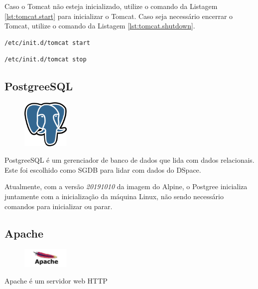 Caso o Tomcat não esteja inicializado, utilize o comando da Listagem \ref{lst:tomcat.start} para inicializar o Tomcat. Caso seja necessário encerrar o Tomcat, utilize o comando da Listagem \ref{lst:tomcat.shutdown}.

\begin{lstlisting}[language=bash, label=lst:tomcat.start, caption=Inicializando Tomcat.]
    /etc/init.d/tomcat start
\end{lstlisting}

\begin{lstlisting}[language=bash, label=lst:tomcat.shutdown, caption=Encerrando Tomcat.]
    /etc/init.d/tomcat stop
\end{lstlisting}

\subsection{PostgreeSQL}\label{postgree}
\begin{figure} %
    \centering
    \includegraphics[width=0.2\textwidth]{../images/postgree.png}
\end{figure}
PostgreeSQL é um gerenciador de banco de dados que lida com dados relacionais. Este foi escolhido como SGDB para lidar com dados do DSpace.

Atualmente, com a versão \textit{20191010} da imagem do Alpine, o Postgree inicializa juntamente com a inicialização da máquina Linux, não sendo necessário comandos para inicializar ou parar.


\subsection{Apache}\label{apache}
\begin{figure} %
    \centering
    \includegraphics[width=0.2\textwidth]{../images/apache.jpg}
\end{figure}
Apache é um servidor web HTTP

